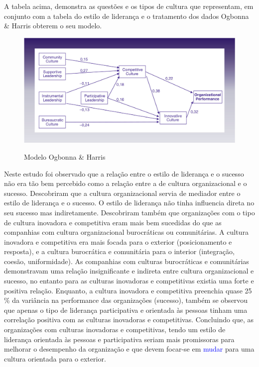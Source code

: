 A tabela acima, demonstra as questões e os tipos de cultura que representam, em conjunto com a tabela do estilo de liderança e o tratamento dos dados Ogbonna \& Harris obterem o seu modelo.
\begin{figure}[H]
\centering
\includegraphics[scale=.35]{./image/OB/Ogbonna_Harris.jpg}\\
\caption{Modelo Ogbonna \& Harris \cite{article_1}}
\label{Modelo}
\end{figure}
Neste estudo foi observado que a relação entre o estilo de liderança e o sucesso não era tão bem percebido como a relação entre a de cultura organizacional e o sucesso. Descobriram que a cultura organizacional servia de mediador entre o estilo de liderança e o sucesso. O estilo de liderança não tinha influencia direta no seu sucesso mas indiretamente. Descobriram também que organizações com o tipo de cultura inovadora e competitiva eram mais bem sucedidas do que as companhias com cultura organizacional burocráticas ou comunitárias. A cultura inovadora e competitiva era mais focada para o exterior (posicionamento e resposta), e a cultura burocrática e comunitária para o interior (integração, coesão, uniformidade). As companhias com culturas burocráticas e comunitárias demonstravam uma relação insignificante e indireta entre cultura organizacional e sucesso, no entanto para as culturas inovadoras e competitivas existia uma forte e positiva relação. Enquanto, a cultura inovadora e competitiva preenchia quase 25 \% da variância na performance das organizações (sucesso), também se observou que apenas o tipo de liderança participativa e orientada às pessoas tinham uma correlação positiva com as culturas inovadoras e competitivas.
\emptyline
Concluindo que, as organizações com culturas inovadoras e competitivas, tendo um estilo de liderança orientada às pessoas e participativa seriam mais promissoras para melhorar o desempenho da organização e que devem focar-se em \textcolor{blue}{mudar} para uma cultura orientada para o exterior. \cite{article_1}
